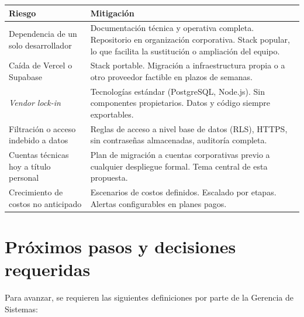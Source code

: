 \documentclass[12pt,a4paper]{article}
\begin{document}
\begin{tabularx}{\textwidth}{@{}>{\raggedright\arraybackslash}p{5.5cm} >{\raggedright\arraybackslash}X@{}}
\toprule
\textbf{Riesgo} & \textbf{Mitigación} \\
\midrule
Dependencia de un solo desarrollador
  & Documentación técnica y operativa completa.
    Repositorio en organización corporativa.
    Stack popular, lo que facilita la sustitución o ampliación del equipo. \\
\addlinespace[0.3em]
Caída de Vercel o Supabase
  & Stack portable. Migración a infraestructura propia o a otro proveedor
    factible en plazos de semanas. \\
\addlinespace[0.3em]
\emph{Vendor lock-in}
  & Tecnologías estándar (PostgreSQL, Node.js).
    Sin componentes propietarios. Datos y código siempre exportables. \\
\addlinespace[0.3em]
Filtración o acceso indebido a datos
  & Reglas de acceso a nivel base de datos (RLS), HTTPS,
    sin contraseñas almacenadas, auditoría completa. \\
\addlinespace[0.3em]
Cuentas técnicas hoy a título personal
  & Plan de migración a cuentas corporativas previo
    a cualquier despliegue formal. Tema central de esta propuesta. \\
\addlinespace[0.3em]
Crecimiento de costos no anticipado
  & Escenarios de costos definidos. Escalado por etapas.
    Alertas configurables en planes pagos. \\
\bottomrule
\end{tabularx}

\section{Próximos pasos y decisiones requeridas}

Para avanzar, se requieren las siguientes definiciones por parte de la Gerencia de Sistemas:
\end{document}
